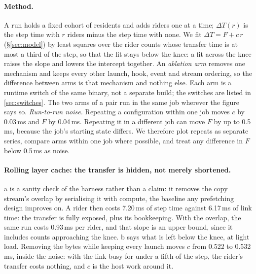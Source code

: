 \paragraph{Method.} A run holds a fixed cohort of residents and adds riders
one at a time; $\Delta T(r)$ is the step time with $r$ riders minus the
step time with none. We fit $\Delta T = F + c\,r$ (\S\ref{sec:model}) by least
squares over the rider counts whose transfer time is at most a third of the
step, so that the fit stays below the knee: a fit across the knee raises the
slope and lowers the intercept together. An \emph{ablation arm} removes one
mechanism and keeps every other launch, hook, event and stream ordering, so the
difference between arms is that mechanism and nothing else. Each arm is a
runtime switch of the same binary, not a separate build; the switches are
listed in \cref{sec:switches}. The two arms of a pair run in the same job
wherever the figure says so.
\emph{Run-to-run noise.} Repeating a configuration within one job moves $c$ by
0.03\,ms and $F$ by 0.04\,ms. Repeating it in a different job can move $F$ by up
to 0.5\,ms, because the job's starting state differs. We therefore plot repeats
as separate series, compare arms within one job where possible, and treat any
difference in $F$ below 0.5\,ms as noise.



\paragraph{Rolling layer cache: the transfer is hidden, not merely
shortened.} a is a sanity check of the harness rather than a
claim: it removes the copy stream's overlap by serialising it with compute, the
baseline any prefetching design improves on. A rider then costs 7.20\,ms of step time against 6.17\,ms of
link time: the transfer is fully exposed, plus its bookkeeping. With the
overlap, the same run costs 0.93\,ms per rider, and that slope is an upper
bound, since it includes counts approaching the knee. b says
what is left below the knee, at light load. Removing the bytes while keeping
every launch moves $c$ from 0.522 to 0.532\,ms, inside the noise: with the link
busy for under a fifth of the step, the rider's transfer costs nothing, and $c$
is the host work around it.

